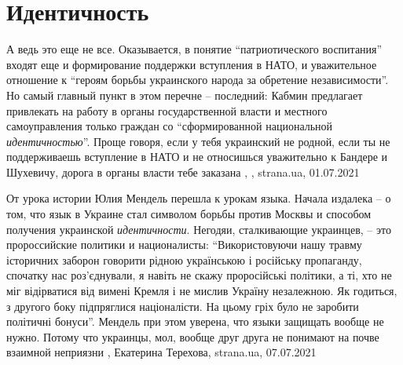  
 
 
 
 
\chapter{Идентичность}
\label{sec:slova.identichnost}

А ведь это еще не все. Оказывается, в понятие \enquote{патриотического воспитания}
входят еще и формирование поддержки вступления в НАТО, и уважительное отношение
к \enquote{героям борьбы украинского народа за обретение независимости}.  Но самый
главный пункт в этом перечне – последний: Кабмин предлагает привлекать на
работу в органы государственной власти и местного самоуправления только граждан
со \enquote{сформированной национальной \emph{идентичностью}}. Проще говоря, если у тебя
украинский не родной, если ты не поддерживаешь вступление в НАТО и не
относишься уважительно к Бандере и Шухевичу, дорога в органы власти тебе
заказана
, 
, strana.ua, 01.07.2021

От урока истории Юлия Мендель перешла к урокам языка.  Начала издалека – о том,
что язык в Украине стал символом борьбы против Москвы и способом получения
украинской \emph{идентичности}. Негодяи, сталкивающие украинцев, – это
пророссийские политики и националисты: \enquote{Використовуючи нашу травму
історичних заборон говорити рідною українською і російську пропаганду, спочатку
нас роз’єднували, я навіть не скажу проросійські політики, а ті, хто не міг
відірватися від вимені Кремля і не мислив Україну незалежною.  Як годиться, з
другого боку підпряглися націоналісти. На цьому гріх було не заробити політичні
бонуси}.  Мендель при этом уверена, что языки защищать вообще не нужно. Потому
что украинцы, мол, вообще друг друга не понимают на почве взаимной неприязни
, 
Екатерина Терехова, strana.ua, 07.07.2021

